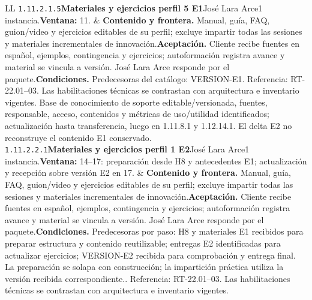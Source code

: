\begin{longtable}{L{\tabcolsep\relax}L{\tabcolsep\relax}}
\texttt{1.\allowbreak{}11.\allowbreak{}2.\allowbreak{}1.\allowbreak{}5}\newline{}\textbf{Materiales y ejercicios perfil 5 E1}\newline{}José Lara Arce\newline{}1 instancia.\newline{}\textbf{Ventana:} 11. & \textbf{Contenido y frontera.} Manual, guía, FAQ, guion/video y ejercicios editables de su perfil; excluye impartir todas las sesiones y materiales incrementales de innovación.\newline{}\textbf{Aceptación.} Cliente recibe fuentes en español, ejemplos, contingencia y ejercicios; autoformación registra avance y material se vincula a versión. José Lara Arce responde por el paquete.\newline{}\textbf{Condiciones.} Predecesoras del catálogo: VERSION-E1. Referencia: RT-22.01--03. Las habilitaciones técnicas se contrastan con arquitectura e inventario vigentes. Base de conocimiento de soporte editable/versionada, fuentes, responsable, acceso, contenidos y métricas de uso/utilidad identificados; actualización hasta transferencia, luego en 1.11.8.1 y 1.12.14.1. El delta E2 no reconstruye el contenido E1 conservado.\\\hline
\texttt{1.\allowbreak{}11.\allowbreak{}2.\allowbreak{}2.\allowbreak{}1}\newline{}\textbf{Materiales y ejercicios perfil 1 E2}\newline{}José Lara Arce\newline{}1 instancia.\newline{}\textbf{Ventana:} 14--17: preparación desde H8 y antecedentes E1; actualización y recepción sobre versión E2 en 17. & \textbf{Contenido y frontera.} Manual, guía, FAQ, guion/video y ejercicios editables de su perfil; excluye impartir todas las sesiones y materiales incrementales de innovación.\newline{}\textbf{Aceptación.} Cliente recibe fuentes en español, ejemplos, contingencia y ejercicios; autoformación registra avance y material se vincula a versión. José Lara Arce responde por el paquete.\newline{}\textbf{Condiciones.} Predecesoras por paso: H8 y materiales E1 recibidos para preparar estructura y contenido reutilizable; entregas E2 identificadas para actualizar ejercicios; VERSION-E2 recibida para comprobación y entrega final. La preparación se solapa con construcción; la impartición práctica utiliza la versión recibida correspondiente.. Referencia: RT-22.01--03. Las habilitaciones técnicas se contrastan con arquitectura e inventario vigentes.\\\hline

\end{longtable}
